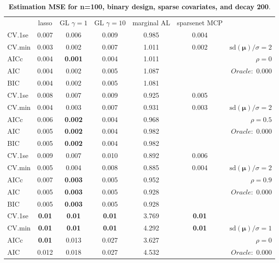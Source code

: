 \clearpage
\begin{table}\vspace{-.5cm}
\caption[l]{ { \bf Estimation MSE for n=100, binary design, 
sparse covariates, and  decay  200}.}
\vspace{-.5cm}
\footnotesize{}
\begin{center}
\begin{tabular}{l*{5}{c}|r}
& lasso & GL $\gamma=1$ & GL $\gamma=10$ & marginal AL & sparsenet MCP  & \\
 \cline{1-7}
CV.1se & 0.007 & 0.006 & 0.009 & 0.985 & 0.004 & \\
CV.min & 0.003 & 0.002 & 0.007 & 1.011 & 0.002 &  $\mathrm{sd}(\mathbf{\mu})/\sigma=2$ \\
AICc & 0.004 & {\bf 0.001} & 0.004 & 1.011 & & $\rho=0$ \\
AIC & 0.004 & 0.002 & 0.005 & 1.087 & &  \multirow{2}{*}{$Oracle: $ 0.000} \\
BIC & 0.004 & 0.002 & 0.005 & 1.081 & &  \\
 \hline 
CV.1se & 0.008 & 0.007 & 0.009 & 0.925 & 0.005 & \\
CV.min & 0.004 & 0.003 & 0.007 & 0.931 & 0.003 &  $\mathrm{sd}(\mathbf{\mu})/\sigma=2$ \\
AICc & 0.006 & {\bf 0.002} & 0.004 & 0.968 & & $\rho=0.5$ \\
AIC & 0.005 & {\bf 0.002} & 0.004 & 0.982 & &  \multirow{2}{*}{$Oracle: $ 0.000} \\
BIC & 0.005 & {\bf 0.002} & 0.004 & 0.982 & &  \\
 \hline 
CV.1se & 0.009 & 0.007 & 0.010 & 0.892 & 0.006 & \\
CV.min & 0.005 & 0.004 & 0.008 & 0.885 & 0.004 &  $\mathrm{sd}(\mathbf{\mu})/\sigma=2$ \\
AICc & 0.007 & {\bf 0.003} & 0.005 & 0.952 & & $\rho=0.9$ \\
AIC & 0.005 & {\bf 0.003} & 0.005 & 0.928 & &  \multirow{2}{*}{$Oracle: $ 0.000} \\
BIC & 0.005 & {\bf 0.003} & 0.005 & 0.928 & &  \\
 \hline 
CV.1se & {\bf 0.01} & {\bf 0.01} & {\bf 0.01} & 3.769 & {\bf 0.01} & \\
CV.min & {\bf 0.01} & {\bf 0.01} & {\bf 0.01} & 4.292 & {\bf 0.01} &  $\mathrm{sd}(\mathbf{\mu})/\sigma=1$ \\
AICc & {\bf 0.01} & 0.013 & 0.027 & 3.627 & & $\rho=0$ \\
AIC & 0.012 & 0.018 & 0.027 & 4.532 & &  \multirow{2}{*}{$Oracle: $ 0.000} \\

\end{tabular}
\end{center}
\end{table}
